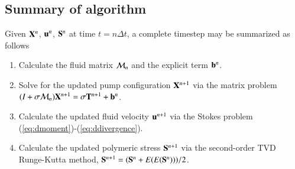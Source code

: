 \subsection{Summary of algorithm}
Given $\mathbf{X}^n$, $\mathbf{u}^n$, $\mathbf{S}^n$ at time $t=n\Delta t$, a complete timestep may be summarized as follows
\begin{enumerate}
\item Calculate the fluid matrix $\mathcal{M}_n$ and the explicit term $\mathbf{b}^n$.
\item Solve for the updated pump configuration $\mathbf{X}^{n+1}$ via the matrix problem $(I + \sigma\mathcal{M}_n)\mathbf{X}^{n+1} = \sigma \mathbf{T}^{n+1} + \mathbf{b}^n$.
\item Calculate the updated fluid velocity $\mathbf{u}^{n+1}$ via the Stokes problem (\ref{eq:dmoment})-(\ref{eq:ddivergence}).
\item Calculate the updated polymeric stress $\mathbf{S}^{n+1}$ via the second-order TVD Runge-Kutta method, $\mathbf{S}^{n+1} = (\mathbf{S}^n + E(E(\mathbf{S}^n))) / 2$.
\end{enumerate}

